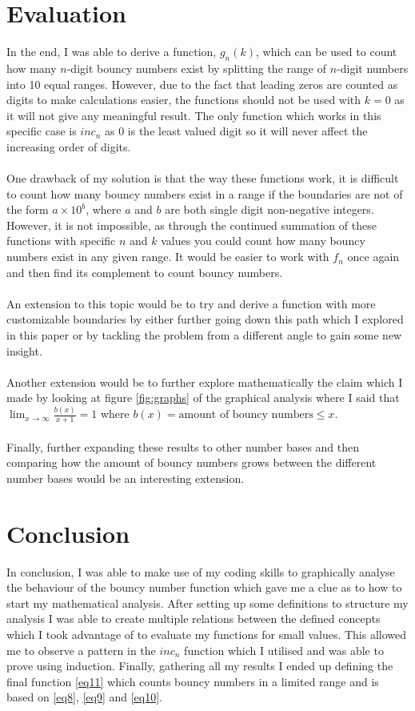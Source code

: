 \documentclass[titlepage,12pt]{article}
\begin{document}
\section{Evaluation}
In the end, I was able to derive a function, $g_n(k)$, which can be used to count how many $n$-digit bouncy numbers exist by splitting the range of $n$-digit numbers into 10 equal ranges. However, due to the fact that leading zeros are counted as digits to make calculations easier, the functions should not be used with $k=0$ as it will not give any meaningful result. The only function which works in this specific case is $inc_n$ as $0$ is the least valued digit so it will never affect the increasing order of digits.\\\\
One drawback of my solution is that the way these functions work, it is difficult to count how many bouncy numbers exist in a range if the boundaries are not of the form $a \times 10^{b}$, where $a$ and $b$ are both single digit non-negative integers. However, it is not impossible, as through the continued summation of these functions with specific $n$ and $k$ values you could count how many bouncy numbers exist in any given range. It would be easier to work with $f_n$ once again and then find its complement to count bouncy numbers.\\\\
An extension to this topic would be to try and derive a function with more customizable boundaries by either further going down this path which I explored in this paper or by tackling the problem from a different angle to gain some new insight.\\\\
Another extension would be to further explore mathematically the claim which I made by looking at figure \ref{fig:graphs} of the graphical analysis where I said that $\lim_{x \to  \infty}\frac{b(x)}{x+1} = 1$ where $b(x) = \text{amount of bouncy numbers} \leq x$.\\\\
Finally, further expanding these results to other number bases and then comparing how the amount of bouncy numbers grows between the different number bases would be an interesting extension.

\section{Conclusion}
In conclusion, I was able to make use of my coding skills to graphically analyse the behaviour of the bouncy number function which gave me a clue as to how to start my mathematical analysis. After setting up some definitions to structure my analysis I was able to create multiple relations between the defined concepts which I took advantage of to evaluate my functions for small values. This allowed me to observe a pattern in the $inc_n$ function which I utilised and was able to prove using induction. Finally, gathering all my results I ended up defining the final function \ref{eq11} which counts bouncy numbers in a limited range and is based on \ref{eq8}, \ref{eq9} and \ref{eq10}.
\end{document}
